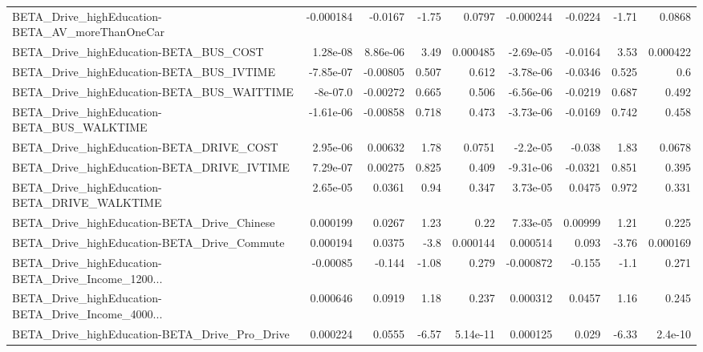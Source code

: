\begin{tabular}{lrrrrrrrr}
BETA\_Drive\_highEducation-BETA\_AV\_moreThanOneCar    &   -0.000184 &      -0.0167 &     -1.75 &   0.0797 &  -0.000244 &     -0.0224 &        -1.71 &        0.0868 \\
BETA\_Drive\_highEducation-BETA\_BUS\_COST             &    1.28e-08 &     8.86e-06 &      3.49 & 0.000485 &  -2.69e-05 &     -0.0164 &         3.53 &      0.000422 \\
BETA\_Drive\_highEducation-BETA\_BUS\_IVTIME           &   -7.85e-07 &     -0.00805 &     0.507 &    0.612 &  -3.78e-06 &     -0.0346 &        0.525 &           0.6 \\
BETA\_Drive\_highEducation-BETA\_BUS\_WAITTIME         &    -8e-07.0 &     -0.00272 &     0.665 &    0.506 &  -6.56e-06 &     -0.0219 &        0.687 &         0.492 \\
BETA\_Drive\_highEducation-BETA\_BUS\_WALKTIME         &   -1.61e-06 &     -0.00858 &     0.718 &    0.473 &  -3.73e-06 &     -0.0169 &        0.742 &         0.458 \\
BETA\_Drive\_highEducation-BETA\_DRIVE\_COST           &    2.95e-06 &      0.00632 &      1.78 &   0.0751 &   -2.2e-05 &      -0.038 &         1.83 &        0.0678 \\
BETA\_Drive\_highEducation-BETA\_DRIVE\_IVTIME         &    7.29e-07 &      0.00275 &     0.825 &    0.409 &  -9.31e-06 &     -0.0321 &        0.851 &         0.395 \\
BETA\_Drive\_highEducation-BETA\_DRIVE\_WALKTIME       &    2.65e-05 &       0.0361 &      0.94 &    0.347 &   3.73e-05 &      0.0475 &        0.972 &         0.331 \\
BETA\_Drive\_highEducation-BETA\_Drive\_Chinese        &    0.000199 &       0.0267 &      1.23 &     0.22 &   7.33e-05 &     0.00999 &         1.21 &         0.225 \\
BETA\_Drive\_highEducation-BETA\_Drive\_Commute        &    0.000194 &       0.0375 &      -3.8 & 0.000144 &   0.000514 &       0.093 &        -3.76 &      0.000169 \\
BETA\_Drive\_highEducation-BETA\_Drive\_Income\_1200... &    -0.00085 &       -0.144 &     -1.08 &    0.279 &  -0.000872 &      -0.155 &         -1.1 &         0.271 \\
BETA\_Drive\_highEducation-BETA\_Drive\_Income\_4000... &    0.000646 &       0.0919 &      1.18 &    0.237 &   0.000312 &      0.0457 &         1.16 &         0.245 \\
BETA\_Drive\_highEducation-BETA\_Drive\_Pro\_Drive      &    0.000224 &       0.0555 &     -6.57 & 5.14e-11 &   0.000125 &       0.029 &        -6.33 &       2.4e-10 \\

\end{tabular}
